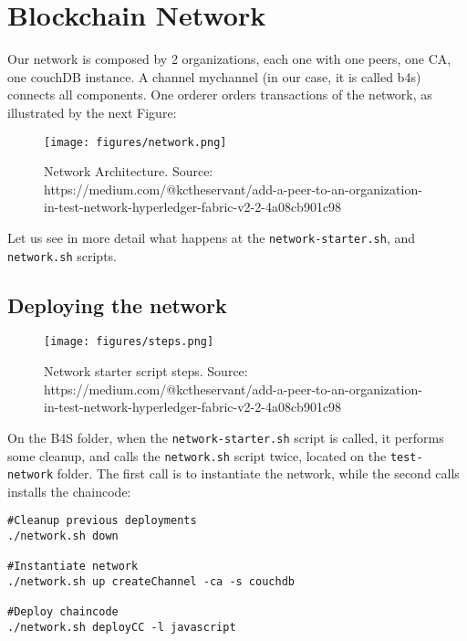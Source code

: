 \documentclass[12pt,a4paper]{article}
\theoremstyle{definition}
\begin{document}


\section{Blockchain Network}

Our network is composed by 2 organizations, each one with one peers, one CA, one couchDB instance. A channel mychannel (in our case, it is called b4s) connects all components. One orderer orders transactions of the network, as illustrated by the next Figure:


\begin{figure}[h]
\centering
\texttt{[image: figures/network.png]}
\caption{Network Architecture. Source: https://medium.com/@kctheservant/add-a-peer-to-an-organization-in-test-network-hyperledger-fabric-v2-2-4a08cb901c98}
\label{fig:architecture}
\end{figure}

Let us see in more detail what happens at the \texttt{network-starter.sh}, and \texttt{network.sh} scripts.

\subsection{Deploying the network}

\begin{figure}[h]
\centering
\texttt{[image: figures/steps.png]}
\caption{Network starter script steps. Source: https://medium.com/@kctheservant/add-a-peer-to-an-organization-in-test-network-hyperledger-fabric-v2-2-4a08cb901c98}
\label{fig:steps}
\end{figure}

On the B4S folder, when the \texttt{network-starter.sh} script is called, it performs some cleanup, and calls the \texttt{network.sh} script twice, located on the \texttt{test-network} folder. The first call is to instantiate the network, while the second calls installs the chaincode:

\begin{verbatim}
#Cleanup previous deployments
./network.sh down

#Instantiate network
./network.sh up createChannel -ca -s couchdb

#Deploy chaincode
./network.sh deployCC -l javascript
\end{verbatim}
\end{document}
